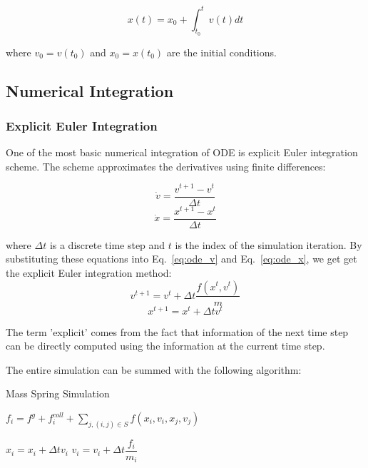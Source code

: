 \documentclass[en]{minipw} %
\begin{document}
\begin{equation}
\label{eq:ode_anal2}
x(t) = x_0 + \int_{t_0}^{t}v(t) dt
\end{equation}

where $v_0 = v(t_0)$ and $x_0 = x(t_0)$ are the initial conditions.

\subsection{Numerical Integration}

\subsubsection{Explicit Euler Integration}

One of the most basic numerical integration of ODE is explicit Euler integration scheme. The scheme approximates the derivatives using finite differences:

\begin{equation}
\dot{v} = \dfrac{v^{t+1} - v^{t}}{\Delta t}
\end{equation}
\begin{equation}
\dot{x} = \dfrac{x^{t+1} - x^{t}}{\Delta t}
\end{equation}

where $\Delta t$ is a discrete time step and $t$ is the index of the simulation iteration. By substituting these equations into Eq.~\ref{eq:ode_v} and Eq.~\ref{eq:ode_x}, we get get the explicit Euler integration method:
\begin{equation}
\label{eq:explicit_euler_ode_v}
v^{t+1} = v^{t} + \Delta t \dfrac{f(x^{t}, v^{t})}{m}
\end{equation}
\begin{equation}
\label{eq:explicit_euler_ode_x}
x^{t+1} = x^{t} + \Delta t v^{t}
\end{equation}

The term 'explicit' comes from the fact that information of the next time step can be directly computed using the information at the current time step.

The entire simulation can be summed with the following algorithm:

\begin{algorithm}
\caption{Mass Spring Simulation}\label{euclid}
\begin{algorithmic}[1]
\State $f_i = f^{g} + f_{i}^{coll} + \sum_{j, (i,j) \in S} f(x_i, v_i, x_j, v_j)$
\EndFor

\State $x_{i} = x_{i} + \Delta t v_i $
\State $v_{i} = v_{i} + \Delta t \dfrac{f_i}{m_i} $
\EndFor

\EndWhile

\EndProcedure
\end{algorithmic}
\end{algorithm}
\end{document}
